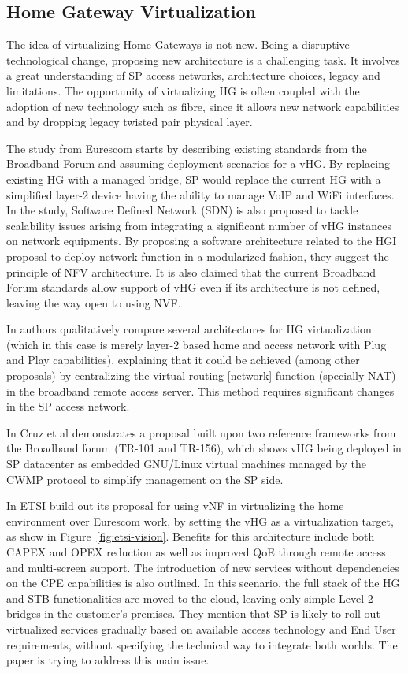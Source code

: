 \subsection{Home Gateway Virtualization}
The idea of virtualizing Home Gateways is not new.
Being a disruptive technological change, proposing new architecture is a challenging task.
It involves a great understanding of SP access networks, architecture choices, legacy and limitations.
The opportunity of virtualizing HG is often coupled with the adoption of new technology such as fibre, since it allows new network capabilities and by dropping legacy twisted pair physical layer.

The study from Eurescom \cite{daniel_abgrall_virtual_????} starts by describing existing standards from the Broadband Forum and assuming deployment scenarios for a vHG.
By replacing existing HG with a managed bridge, SP would replace the current HG with a simplified layer-2 device having the ability to manage VoIP and WiFi interfaces.
In the study, Software Defined Network (SDN) is also proposed to tackle scalability issues arising from integrating a significant number of vHG instances on network equipments.
By proposing a software architecture related to the HGI proposal to deploy network function in a modularized fashion, they suggest the principle of NFV architecture.
It is also claimed that the current Broadband Forum standards allow support of vHG even if its architecture is not defined, leaving the way open to using NVF.

In \cite{da_silva_home_2011} authors qualitatively compare several architectures for HG virtualization (which in this case is merely layer-2 based home and access network with Plug and Play capabilities), explaining that it could be achieved (among other proposals) by centralizing the virtual routing [network] function (specially NAT) in the broadband remote access server.
This method requires significant changes in the SP access network.

In \cite{cruz_architecture_2013} Cruz et al demonstrates a proposal built upon two reference frameworks from the Broadband forum (TR-101 and TR-156), which shows vHG being deployed in SP datacenter as embedded GNU/Linux virtual machines managed by the CWMP protocol to simplify management on the SP side.

In \cite{_network_2013} ETSI build out its proposal for using vNF in virtualizing the home environment over Eurescom work, by setting the vHG as a virtualization target, as show in Figure~\ref{fig:etsi-vision}.
Benefits for this architecture include both CAPEX and OPEX reduction as well as improved QoE through remote access and multi-screen support.
The introduction of new services without dependencies on the CPE capabilities is also outlined.
In this scenario, the full stack of the HG and STB functionalities are moved to the cloud, leaving only simple Level-2 bridges in the customer's premises.
They mention that SP is likely to roll out virtualized services gradually based on available access technology and End User requirements, without specifying the technical way to integrate both worlds.
The paper is trying to address this main issue.

